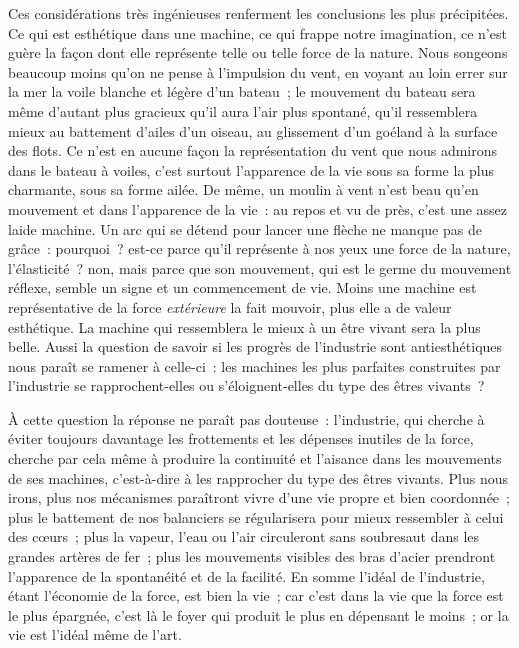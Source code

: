 \documentclass[french,twoside]{book} %
\begin{document}
Ces considérations très ingénieuses renferment les conclusions les plus précipitées. Ce qui est esthétique dans une machine, ce qui frappe notre imagination, ce n’est guère la façon dont elle représente telle ou telle force de la nature. Nous songeons beaucoup moins qu’on ne pense à l’impulsion du vent, en voyant au loin errer sur la mer la voile blanche et légère d’un bateau ; le mouvement du bateau sera même d’autant plus gracieux qu’il aura l’air plus spontané, qu’il ressemblera mieux au battement d’ailes d’un oiseau, au glissement d’un goéland à la surface des flots. Ce n’est en aucune façon la représentation du vent que nous admirons dans le bateau à voiles, c’est surtout l’apparence de la vie sous sa forme la plus charmante, sous sa forme ailée. De même, un moulin à vent n’est beau qu’en mouvement et dans l’apparence de la vie : au repos et vu de près, c’est une assez laide machine. Un arc qui se détend pour lancer une flèche ne manque pas de grâce : pourquoi ? est-ce parce qu’il représente à nos yeux une force de la nature, l’élasticité ? non, mais parce que son mouvement, qui est le germe du mouvement réflexe, semble un signe et un commencement de vie. Moins une machine est représentative de la force \emph{extérieure} la fait mouvoir, plus elle a de valeur esthétique. La machine qui ressemblera le  mieux à un être vivant sera la plus belle. Aussi la question de savoir si les progrès de l’industrie sont antiesthétiques nous paraît se ramener à celle-ci : les machines les plus parfaites construites par l’industrie se rapprochent-elles ou s’éloignent-elles du type des êtres vivants ?\par
À cette question la réponse ne paraît pas douteuse : l’industrie, qui cherche à éviter toujours davantage les frottements et les dépenses inutiles de la force, cherche par cela même à produire la continuité et l’aisance dans les mouvements de ses machines, c’est-à-dire à les rapprocher du type des êtres vivants. Plus nous irons, plus nos mécanismes paraîtront vivre d’une vie propre et bien coordonnée ; plus le battement de nos balanciers se régularisera pour mieux ressembler à celui des cœurs ; plus la vapeur, l’eau ou l’air circuleront sans soubresaut dans les grandes artères de fer ; plus les mouvements visibles des bras d’acier prendront l’apparence de la spontanéité et de la facilité. En somme l’idéal de l’industrie, étant l’économie de la force, est bien la vie ; car c’est dans la vie que la force est le plus épargnée, c’est là le foyer qui produit le plus en dépensant le moins ; or la vie est l’idéal même de l’art.\par
\end{document}
